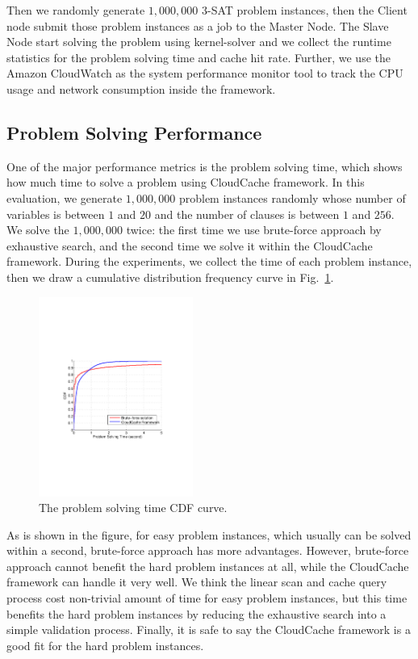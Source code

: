 Then we randomly generate $1,000,000$ 3-SAT problem instances, then the Client node submit those problem instances as a job to the Master Node. The Slave Node start solving the problem using kernel-solver and we collect the runtime statistics for the problem solving time and cache hit rate. Further, we use the Amazon CloudWatch as the system performance monitor tool to track the CPU usage and network consumption inside the framework.

\subsection{Problem Solving Performance}
One of the major performance metrics is the problem solving time, which shows how much time to solve a problem using CloudCache framework. In this evaluation, we generate $1,000,000$ problem instances randomly whose number of variables is between $1$ and $20$ and the number of clauses is between $1$ and $256$. We solve the $1,000,000$ twice: the first time we use brute-force approach by exhaustive search, and the second time we solve it within the CloudCache framework. During the experiments, we collect the time of each problem instance, then we draw a cumulative distribution frequency curve in Fig.~\ref{fig:time}.

\begin{figure}
\centering
\includegraphics[width=0.45\textwidth]{pics/time.pdf}
\caption{The problem solving time CDF curve.}
\label{fig:time}
\end{figure}

As is shown in the figure, for easy problem instances, which usually can be  solved within a second, brute-force approach has more advantages. However, brute-force approach cannot benefit the hard problem instances at all, while the CloudCache framework can handle it very well. We think the linear scan and cache query process cost non-trivial amount of time for easy problem instances, but this time benefits the hard problem instances by reducing the exhaustive search into a simple validation process. Finally, it is safe to say the CloudCache framework is a good fit for the hard problem instances.

